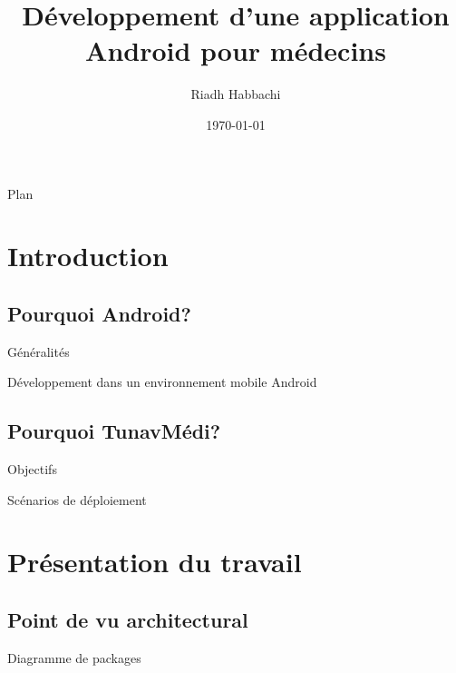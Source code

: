 \documentclass[
ucs
, xcolor=table
]{beamer}
\title[Projet de fin d'etudes]
{Développement d'une application Android pour médecins}
\author{Riadh Habbachi}
\institute[ENIG]{Ecole Nationale d'Ingénieurs de Gabes}
\date[]{\today}
\begin{document}

\begin{frame}
	\titlepage
\end{frame}

\begin{frame}{Plan}
	\tableofcontents
\end{frame}

\section{Introduction}
\subsection{Pourquoi Android?}

\begin{frame}{Généralités}%
\only<+>{
	
}
\only<+>{
	
}
\end{frame}

\begin{frame}{Développement dans un environnement mobile Android} %
\end{frame}

\subsection{Pourquoi TunavMédi?}%
\begin{frame}{Objectifs}

\end{frame}

\begin{frame}{Scénarios de déploiement}
\only<+>{
	
}

\only<+>{
	
}
\end{frame}

\section{Présentation du travail}%

\subsection{Point de vu architectural}
\begin{frame}{Diagramme de packages}

\end{frame}
\end{document}
